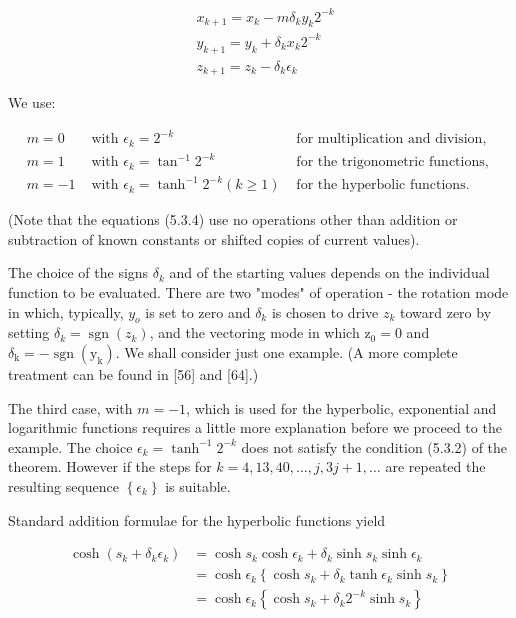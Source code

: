 \documentclass[10pt]{article}
\begin{document}
\begin{align*}
& x_{k+1}=x_{k}-m \delta_{k} y_{k} 2^{-k} \\
& y_{k+1}=y_{k}+\delta_{k} x_{k} 2^{-k} \\
& z_{k+1}=z_{k}-\delta_{k} \epsilon_{k} \tag{5.3.4}
\end{align*}


We use:

$$
\begin{array}{lll}
m=0 & \text { with } \epsilon_{k}=2^{-k} & \text { for multiplication and division, } \\
m=1 & \text { with } \epsilon_{k}=\tan ^{-1} 2^{-k} & \text { for the trigonometric functions, } \\
m=-1 & \text { with } \epsilon_{k}=\tanh ^{-1} 2^{-k}(k \geqslant 1) & \text { for the hyperbolic functions. }
\end{array}
$$

(Note that the equations (5.3.4) use no operations other than addition or subtraction of known constants or shifted copies of current values).

The choice of the signs $\delta_{k}$ and of the starting values depends on the individual function to be evaluated. There are two "modes" of operation - the rotation mode in which, typically, $y_{o}$ is set to zero and $\delta_{k}$ is chosen to drive $z_{k}$ toward zero by setting $\delta_{k}=\operatorname{sgn}\left(z_{k}\right)$, and the vectoring mode in which $\mathrm{z}_{0}=0$ and $\delta_{\mathrm{k}}=-\operatorname{sgn}\left(\mathrm{y}_{\mathrm{k}}\right)$. We shall consider just one example. (A more complete treatment can be found in [56] and [64].)

The third case, with $m=-1$, which is used for the hyperbolic, exponential and logarithmic functions requires a little more explanation before we proceed to the example. The choice $\epsilon_{k}=\tanh ^{-1} 2^{-k}$ does not satisfy the condition (5.3.2) of the theorem. However if the steps for $k=4,13,40, \ldots, j, 3 j+1, \ldots$ are repeated the resulting sequence $\left\{\epsilon_{k}\right\}$ is suitable.

Standard addition formulae for the hyperbolic functions yield


\begin{align*}
\cosh \left(s_{k}+\delta_{k} \epsilon_{k}\right) & =\cosh s_{k} \cosh \epsilon_{k}+\delta_{k} \sinh s_{k} \sinh \epsilon_{k} \\
& =\cosh \epsilon_{k}\left\{\cosh s_{k}+\delta_{k} \tanh \epsilon_{k} \sinh s_{k}\right\} \\
& =\cosh \epsilon_{k}\left\{\cosh s_{k}+\delta_{k} 2^{-k} \sinh s_{k}\right\} \tag{5.3.5}
\end{align*}
\end{document}

